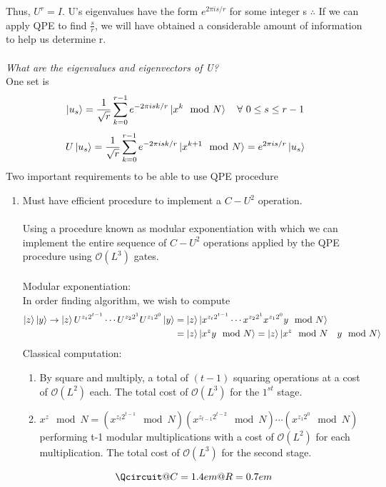 \documentclass[]{article}
\theoremstyle{nonumberplain}
\begin{document}
Thus, $U^{r}=I$. U's eigenvalues have the form $e^{2\pi is/r}$ for some integer s $\therefore$ If we can apply QPE to find  $\frac{s}{r}$, we will have obtained a considerable amount of information to help us determine r.\\
\\
\textit{What are the eigenvalues and eigenvectors of U?}\\
One set is 
\[
	\ket{u_s} = \frac{1}{\sqrt{r}} \sum^{r-1}_{k=0} e^{-2\pi i s k /r}\ket{x^{k}\mod{N}}\quad \forall\ 0\leq s \leq r-1 
\]
\[
U\ket{u_{s}} = \frac{1}{\sqrt{r}} \sum^{r-1}_{k=0} e^{-2\pi i s k /r}\ket{x^{k+1}\mod{N}} = e^{2\pi i s  /r}\ket{u_{s}}
\] 
Two important requirements to be able to use QPE procedure
\begin{enumerate}
	\item Must have efficient procedure to implement a $C-U^{2}$ operation.\\\\
		Using a procedure known as modular exponentiation with which we can implement the entire sequence of $C-U^{2}$ operations applied by the QPE procedure using $\mathcal{O}(L^{3})$ gates. \\\\
	Modular exponentiation:\\ In order finding algorithm, we wish to compute 
\begin{equation*}
\begin{aligned}
	\ket{z}\ket{y}\rightarrow \ket{z}U^{z_{t}2^{t-1}}\cdots U^{z_{2}2^{1}}U^{z_{1}2^{0}}\ket{y} &= \ket{z}\ket{x^{z_{t}2^{t-1}}\cdots x^{z_{2}2^{1}}x^{z_{1}2^{0}}y\mod{N}} \\
																															  &= \ket{z}\ket{x^{z}y\mod{N}} = \ket{z}\ket{x^{z}\mod{N}\quad y\mod{N}}
\end{aligned}
\end{equation*}
Classical computation: 
\begin{enumerate}
	\item By square and multiply, a total of $(t-1)$ squaring operations at a cost of  $\mathcal{O}(L^{2})$ each. The total cost of $\mathcal{O}(L^{3})$ for the $1^{st}$ stage.
	\item $x^{z}\mod{N}=(x^{z_{t}2^{t-1}}\mod{N})(x^{z_{t-1}2^{t-2}}\mod{N})\cdots (x^{z_{1}2^{0}}\mod{N})$ performing t-1 modular multiplications with a cost of $\mathcal{O}(L^{2})$ for each multiplication. The total cost of $\mathcal{O}(L^{3})$ for the second stage.
\end{enumerate}
\[
\Qcircuit @C=1.4em @R=0.7em{
}\]
\end{enumerate}
\end{document}
